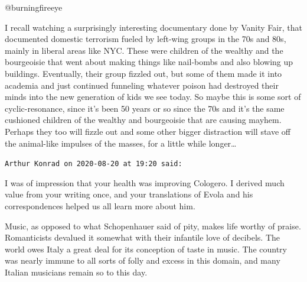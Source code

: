 \begin{footnotesize}
\begin{sffamily}
@burningfireeye

I recall watching a surprisingly interesting documentary done by Vanity Fair, that documented domestic terrorism fueled by left-wing groups in the 70s and 80s, mainly in liberal areas like NYC. These were children of the wealthy and the bourgeoisie that went about making things like nail-bombs and also blowing up buildings. Eventually, their group fizzled out, but some of them made it into academia and just continued funneling whatever poison had destroyed their minds into the new generation of kids we see today. So maybe this is some sort of cyclic-resonance, since it's been 50 years or so since the 70s and it's the same cushioned children of the wealthy and bourgeoisie that are causing mayhem. Perhaps they too will fizzle out and some other bigger distraction will stave off the animal-like impulses of the masses, for a little while longer…


\hfill

\texttt{Arthur Konrad on 2020-08-20 at 19:20 said: }

I was of impression that your health was improving Cologero. I derived much value from your writing once, and your translations of Evola and his correspondences helped us all learn more about him.

Music, as opposed to what Schopenhauer said of pity, makes life worthy of praise. Romanticists devalued it somewhat with their infantile love of decibels. The world owes Italy a great deal for its conception of taste in music. The country was nearly immune to all sorts of folly and excess in this domain, and many Italian musicians remain so to this day.


\hfill


\end{sffamily}\end{footnotesize}
